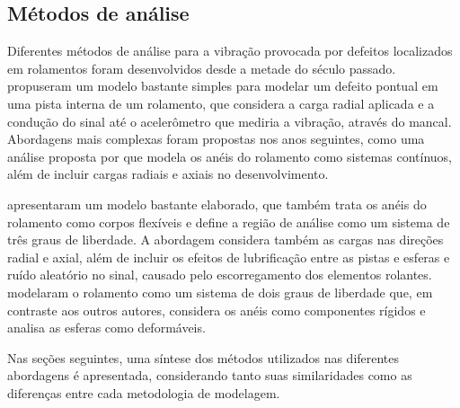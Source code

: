 \documentclass[12pt,oneside,english,brazil]{ucsmono}
\begin{document}
	\subsection{Métodos de análise}
	Diferentes métodos de análise para a vibração provocada por defeitos localizados em rolamentos foram desenvolvidos desde a metade do século passado. \citeauthor{mcfadden:1984} propuseram um modelo bastante simples para modelar um defeito pontual em uma pista interna de um rolamento, que considera a carga radial aplicada e a condução do sinal até o acelerômetro que mediria a vibração, através do mancal. Abordagens mais complexas foram propostas nos anos seguintes, como uma análise proposta por \citeauthor{tandon:1997} que modela os anéis do rolamento como sistemas contínuos, além de incluir cargas radiais e axiais no desenvolvimento.
	
	\citeauthor{sassi:2007} apresentaram um modelo bastante elaborado, que também trata os anéis do rolamento como corpos flexíveis e define a região de análise como um sistema de três graus de liberdade. A abordagem considera também as cargas nas direções radial e axial, além de incluir os efeitos de lubrificação entre as pistas e esferas e ruído aleatório no sinal, causado pelo escorregamento dos elementos rolantes.	\citeauthor{patil:2010} modelaram o rolamento como um sistema de dois graus de liberdade que, em contraste aos outros autores, considera os anéis como componentes rígidos e analisa as esferas como deformáveis.
	
	Nas seções seguintes, uma síntese dos métodos utilizados nas diferentes abordagens é apresentada, considerando tanto suas similaridades como as diferenças entre cada metodologia de modelagem.
	
\end{document}
